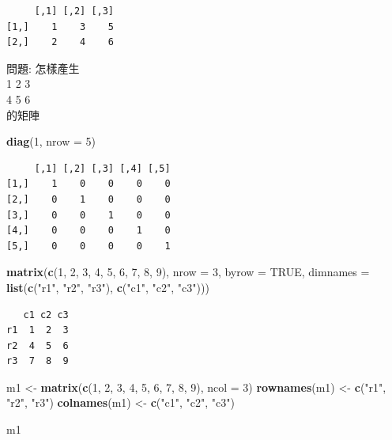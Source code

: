 \documentclass[]{book}
\newenvironment{Shaded}{\begin{snugshade}}{\end{snugshade}}
\newcommand{\DataTypeTok}[1]{\textcolor[rgb]{0.13,0.29,0.53}{#1}}
\newcommand{\DecValTok}[1]{\textcolor[rgb]{0.00,0.00,0.81}{#1}}
\newcommand{\KeywordTok}[1]{\textcolor[rgb]{0.13,0.29,0.53}{\textbf{#1}}}
\newcommand{\NormalTok}[1]{#1}
\newcommand{\OtherTok}[1]{\textcolor[rgb]{0.56,0.35,0.01}{#1}}
\newcommand{\StringTok}[1]{\textcolor[rgb]{0.31,0.60,0.02}{#1}}
\theoremstyle{definition}
\theoremstyle{definition}
\theoremstyle{definition}
\theoremstyle{remark}
\begin{document}
\begin{verbatim}
     [,1] [,2] [,3]
[1,]    1    3    5
[2,]    2    4    6
\end{verbatim}

問題: 怎樣產生\\
1 2 3\\
4 5 6\\
的矩陣

\begin{Shaded}
\begin{Highlighting}[]
\KeywordTok{diag}\NormalTok{(}\DecValTok{1}\NormalTok{, }\DataTypeTok{nrow =} \DecValTok{5}\NormalTok{)}
\end{Highlighting}
\end{Shaded}

\begin{verbatim}
     [,1] [,2] [,3] [,4] [,5]
[1,]    1    0    0    0    0
[2,]    0    1    0    0    0
[3,]    0    0    1    0    0
[4,]    0    0    0    1    0
[5,]    0    0    0    0    1
\end{verbatim}

\begin{Shaded}
\begin{Highlighting}[]
\KeywordTok{matrix}\NormalTok{(}\KeywordTok{c}\NormalTok{(}\DecValTok{1}\NormalTok{, }\DecValTok{2}\NormalTok{, }\DecValTok{3}\NormalTok{, }\DecValTok{4}\NormalTok{, }\DecValTok{5}\NormalTok{, }\DecValTok{6}\NormalTok{, }\DecValTok{7}\NormalTok{, }\DecValTok{8}\NormalTok{, }\DecValTok{9}\NormalTok{), }\DataTypeTok{nrow =} \DecValTok{3}\NormalTok{, }\DataTypeTok{byrow =} \OtherTok{TRUE}\NormalTok{, }\DataTypeTok{dimnames =} \KeywordTok{list}\NormalTok{(}\KeywordTok{c}\NormalTok{(}\StringTok{"r1"}\NormalTok{, }\StringTok{"r2"}\NormalTok{, }\StringTok{"r3"}\NormalTok{), }\KeywordTok{c}\NormalTok{(}\StringTok{"c1"}\NormalTok{, }\StringTok{"c2"}\NormalTok{, }\StringTok{"c3"}\NormalTok{)))}
\end{Highlighting}
\end{Shaded}

\begin{verbatim}
   c1 c2 c3
r1  1  2  3
r2  4  5  6
r3  7  8  9
\end{verbatim}

\begin{Shaded}
\begin{Highlighting}[]
\NormalTok{m1 <-}\StringTok{ }\KeywordTok{matrix}\NormalTok{(}\KeywordTok{c}\NormalTok{(}\DecValTok{1}\NormalTok{, }\DecValTok{2}\NormalTok{, }\DecValTok{3}\NormalTok{, }\DecValTok{4}\NormalTok{, }\DecValTok{5}\NormalTok{, }\DecValTok{6}\NormalTok{, }\DecValTok{7}\NormalTok{, }\DecValTok{8}\NormalTok{, }\DecValTok{9}\NormalTok{), }\DataTypeTok{ncol =} \DecValTok{3}\NormalTok{)}
\KeywordTok{rownames}\NormalTok{(m1) <-}\StringTok{ }\KeywordTok{c}\NormalTok{(}\StringTok{"r1"}\NormalTok{, }\StringTok{"r2"}\NormalTok{, }\StringTok{"r3"}\NormalTok{)}
\KeywordTok{colnames}\NormalTok{(m1) <-}\StringTok{ }\KeywordTok{c}\NormalTok{(}\StringTok{"c1"}\NormalTok{, }\StringTok{"c2"}\NormalTok{, }\StringTok{"c3"}\NormalTok{)}

\NormalTok{m1}
\end{Highlighting}
\end{Shaded}
\end{document}
